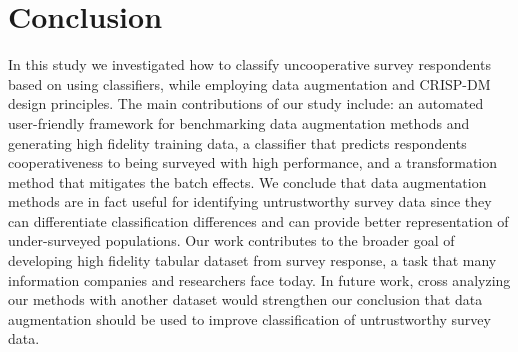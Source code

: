 \section{Conclusion}
In this study we investigated how to classify uncooperative survey respondents based on using classifiers, while employing data augmentation and CRISP-DM design principles. The main contributions of our study include: an automated user-friendly framework for benchmarking data augmentation methods and generating high fidelity training data, a classifier that predicts respondents cooperativeness to being surveyed with high performance, and a transformation method that mitigates the batch effects. We conclude that data augmentation methods are in fact useful for identifying untrustworthy survey data since they can differentiate classification differences and can provide better representation of under-surveyed populations. Our work contributes to the broader goal of developing high fidelity tabular dataset from survey response, a task that many information companies and researchers face today. In future work, cross analyzing our methods with another dataset would strengthen our conclusion that data augmentation should be used to improve classification of untrustworthy survey data. 